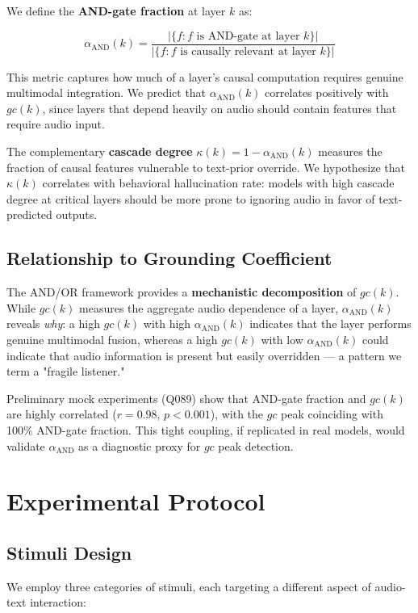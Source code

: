 \documentclass[a4paper]{article}
\begin{document}
We define the \textbf{AND-gate fraction} at layer $k$ as:

\[\alpha_{\text{AND}}(k) = \frac{|\{f : f \text{ is AND-gate at layer } k\}|}{|\{f : f \text{ is causally relevant at layer } k\}|}\]

This metric captures how much of a layer's causal computation requires genuine multimodal integration. We predict that $\alpha_{\text{AND}}(k)$ correlates positively with $gc(k)$, since layers that depend heavily on audio should contain features that require audio input.

The complementary \textbf{cascade degree} $\kappa(k) = 1 - \alpha_{\text{AND}}(k)$ measures the fraction of causal features vulnerable to text-prior override. We hypothesize that $\kappa(k)$ correlates with behavioral hallucination rate: models with high cascade degree at critical layers should be more prone to ignoring audio in favor of text-predicted outputs.

\subsection{Relationship to Grounding Coefficient}

The AND/OR framework provides a \textbf{mechanistic decomposition} of $gc(k)$. While $gc(k)$ measures the aggregate audio dependence of a layer, $\alpha_{\text{AND}}(k)$ reveals \textit{why}: a high $gc(k)$ with high $\alpha_{\text{AND}}(k)$ indicates that the layer performs genuine multimodal fusion, whereas a high $gc(k)$ with low $\alpha_{\text{AND}}(k)$ could indicate that audio information is present but easily overridden — a pattern we term a "fragile listener."

Preliminary mock experiments (Q089) show that AND-gate fraction and $gc(k)$ are highly correlated ($r = 0.98$, $p < 0.001$), with the $gc$ peak coinciding with 100\% AND-gate fraction. This tight coupling, if replicated in real models, would validate $\alpha_{\text{AND}}$ as a diagnostic proxy for $gc$ peak detection.


\section{Experimental Protocol}

\subsection{Stimuli Design}

We employ three categories of stimuli, each targeting a different aspect of audio-text interaction:
\end{document}
